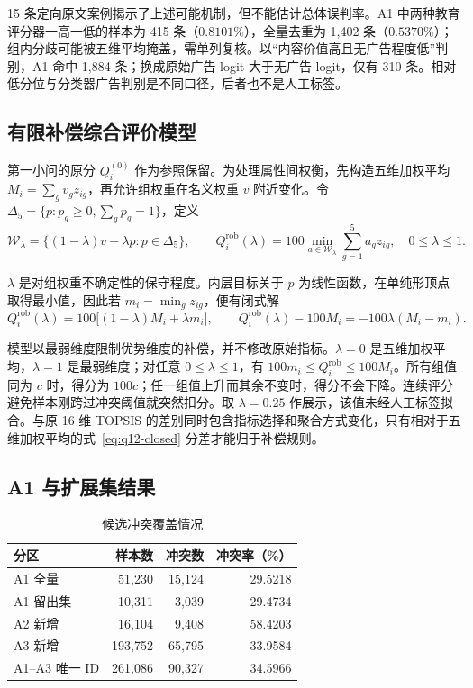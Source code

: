 \documentclass[UTF8,a4paper,12pt]{ctexart}
\begin{document}
15 条定向原文案例揭示了上述可能机制，但不能估计总体误判率。A1 中两种教育评分器一高一低的样本为 415 条（$0.8101\%$），全量去重为 1,402 条（$0.5370\%$）；组内分歧可能被五维平均掩盖，需单列复核。以“内容价值高且无广告程度低”判别，A1 命中 1,884 条；换成原始广告 logit 大于无广告 logit，仅有 310 条。相对低分位与分类器广告判别是不同口径，后者也不是人工标签。

\subsection{有限补偿综合评价模型}

第一小问的原分 $Q_i^{(0)}$ 作为参照保留。为处理属性间权衡，先构造五维加权平均 $M_i=\sum_gv_gz_{ig}$，再允许组权重在名义权重 $v$ 附近变化。令 $\Delta_5=\{p:p_g\geq0,\sum_gp_g=1\}$，定义
\begin{equation}
\mathcal W_{\lambda}=\{(1-\lambda)v+\lambda p:p\in\Delta_5\},\qquad
Q_i^{\mathrm{rob}}(\lambda)=100\min_{a\in\mathcal W_{\lambda}}\sum_{g=1}^{5}a_gz_{ig},
\quad 0\leq\lambda\leq1.
\label{eq:q12-robust}
\end{equation}

$\lambda$ 是对组权重不确定性的保守程度。内层目标关于 $p$ 为线性函数，在单纯形顶点取得最小值，因此若 $m_i=\min_g z_{ig}$，便有闭式解
\begin{equation}
Q_i^{\mathrm{rob}}(\lambda)=100\big[(1-\lambda)M_i+\lambda m_i\big],\qquad
Q_i^{\mathrm{rob}}(\lambda)-100M_i=-100\lambda(M_i-m_i).
\label{eq:q12-closed}
\end{equation}

模型以最弱维度限制优势维度的补偿，并不修改原始指标。$\lambda=0$ 是五维加权平均，$\lambda=1$ 是最弱维度；对任意 $0\leq\lambda\leq1$，有 $100m_i\leq Q_i^{\mathrm{rob}}\leq100M_i$。所有组值同为 $c$ 时，得分为 $100c$；任一组值上升而其余不变时，得分不会下降。连续评分避免样本刚跨过冲突阈值就突然扣分。取 $\lambda=0.25$ 作展示，该值未经人工标签拟合。与原 16 维 TOPSIS 的差别同时包含指标选择和聚合方式变化，只有相对于五维加权平均的式~\eqref{eq:q12-closed} 分差才能归于补偿规则。

\subsection{A1 与扩展集结果}

\begin{table}[htbp]
\centering
\caption{候选冲突覆盖情况}
\label{tab:q12-coverage}
\begin{tabular}{lrrr}
\toprule
分区 & 样本数 & 冲突数 & 冲突率（\%） \\
\midrule
A1 全量         & 51,230  & 15,124 & 29.5218 \\
A1 留出集       & 10,311  & 3,039  & 29.4734 \\
A2 新增         & 16,104  & 9,408  & 58.4203 \\
A3 新增         & 193,752 & 65,795 & 33.9584 \\
A1--A3 唯一 ID & 261,086 & 90,327 & 34.5966 \\
\bottomrule
\end{tabular}
\end{table}
\end{document}

